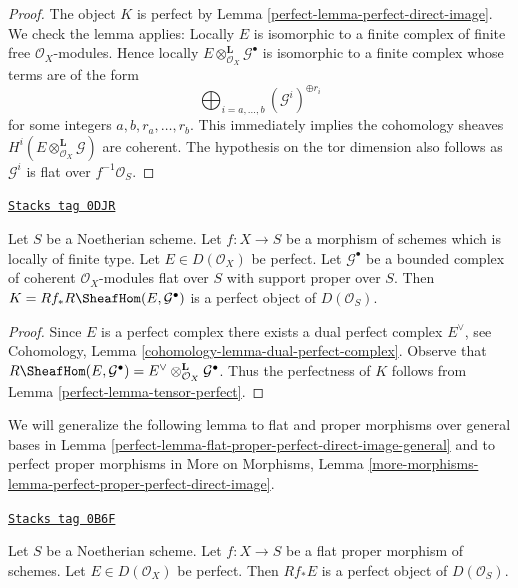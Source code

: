 \begin{proof}

The object $K$ is perfect by Lemma \ref{perfect-lemma-perfect-direct-image}.
We check the lemma applies: Locally $E$ is isomorphic to a finite complex
of finite free $\mathcal{O}_X$-modules. Hence locally
$E \otimes^\mathbf{L}_{\mathcal{O}_X} \mathcal{G}^\bullet$ is isomorphic
to a finite complex whose terms are of the form
$$
\bigoplus\nolimits_{i = a, \ldots, b} (\mathcal{G}^i)^{\oplus r_i}
$$
for some integers $a, b, r_a, \ldots, r_b$. This immediately implies the
cohomology sheaves $H^i(E \otimes^\mathbf{L}_{\mathcal{O}_X} \mathcal{G})$
are coherent. The hypothesis on the tor dimension also follows as
$\mathcal{G}^i$ is flat over $f^{-1}\mathcal{O}_S$.
\end{proof}

\begin{lemma}
\label{perfect-lemma-ext-perfect}
\href{https://stacks.math.columbia.edu/tag/0DJR}{\texttt{Stacks tag 0DJR}}

Let $S$ be a Noetherian scheme. Let $f : X \to S$ be a morphism of schemes
which is locally of finite type. Let $E \in D(\mathcal{O}_X)$ be perfect.
Let $\mathcal{G}^\bullet$ be a bounded complex of coherent
$\mathcal{O}_X$-modules flat over $S$ with support proper over $S$.
Then $K = Rf_*R\SheafHom(E, \mathcal{G}^\bullet)$ is a perfect object of
$D(\mathcal{O}_S)$.
\end{lemma}

\begin{proof}

Since $E$ is a perfect complex there exists a dual perfect complex
$E^\vee$, see Cohomology, Lemma \ref{cohomology-lemma-dual-perfect-complex}.
Observe that $R\SheafHom(E, \mathcal{G}^\bullet) =
E^\vee \otimes^\mathbf{L}_{\mathcal{O}_X} \mathcal{G}^\bullet$.
Thus the perfectness of $K$ follows from Lemma \ref{perfect-lemma-tensor-perfect}.
\end{proof}

We will generalize the following lemma to flat and proper morphisms
over general bases in
Lemma \ref{perfect-lemma-flat-proper-perfect-direct-image-general}
and to perfect proper morphisms in
More on Morphisms, Lemma
\ref{more-morphisms-lemma-perfect-proper-perfect-direct-image}.

\begin{lemma}
\label{perfect-lemma-flat-proper-perfect-direct-image}
\href{https://stacks.math.columbia.edu/tag/0B6F}{\texttt{Stacks tag 0B6F}}

Let $S$ be a Noetherian scheme. Let $f : X \to S$ be a flat proper
morphism of schemes. Let $E \in D(\mathcal{O}_X)$ be perfect. Then
$Rf_*E$ is a perfect object of $D(\mathcal{O}_S)$.
\end{lemma}

